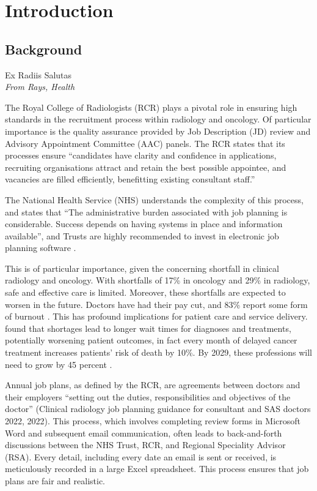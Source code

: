 \chapter{Introduction}
\section{Background} \label{Background}
\epigraph{Ex Radiis Salutas\\\textit{From Rays, Health}}{}
The Royal College of Radiologists (RCR) plays a pivotal role in ensuring high standards in the recruitment process within radiology and oncology. Of particular importance is the quality assurance provided by Job Description (JD) review and Advisory Appointment Committee (AAC) panels. The RCR states that its processes ensure “candidates have clarity and confidence in applications, recruiting organisations attract and retain the best possible appointee, and vacancies are filled efficiently, benefitting existing consultant staff.” \parencite{the_royal_college_of_radiologists_clinical_2022} 

The National Health Service (NHS) understands the complexity of this process, and states that “The administrative burden associated with job planning is considerable. Success depends on having systems in place and information available”, and Trusts are highly recommended to invest in electronic job planning software \parencite{national_health_service_consultant_2017}.

This is of particular importance, given the concerning shortfall in clinical radiology and oncology. With shortfalls of 17\% in oncology and 29\% in radiology, safe and effective care is limited. Moreover, these shortfalls are expected to worsen in the future. Doctors have had their pay cut, and 83\% report some form of burnout \parencite{the_royal_college_of_radiologists_rcr_2023}. This has profound implications for patient care and service delivery. \textcite{limb_shortages_2022} found that shortages lead to longer wait times for diagnoses and treatments, potentially worsening patient outcomes, in fact every month of delayed cancer treatment increases patients’ risk of death by 10\%. By 2029, these professions will need to grow by 45 percent \parencite{national_health_service_strategic_2018}.

Annual job plans, as defined by the RCR, are agreements between doctors and their employers “setting out the duties, responsibilities and objectives of the doctor” (Clinical radiology job planning guidance for consultant and SAS doctors 2022, 2022). This process, which involves completing review forms in Microsoft Word and subsequent email communication, often leads to back-and-forth discussions between the NHS Trust, RCR, and Regional Speciality Advisor (RSA). Every detail, including every date an email is sent or received, is meticulously recorded in a large Excel spreadsheet. This process ensures that job plans are fair and realistic.

